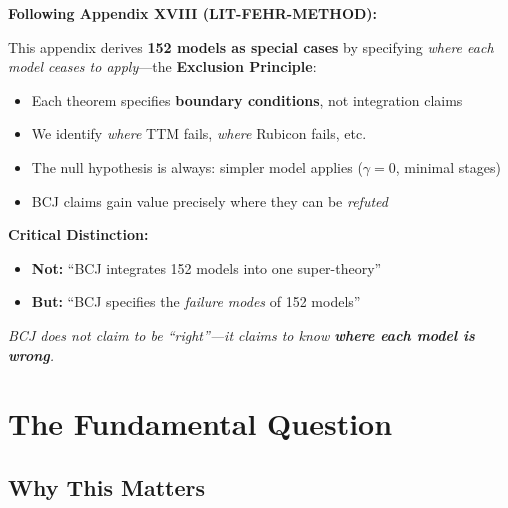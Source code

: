 \begin{tcolorbox}[colback=red!5!white, colframe=red!75!black,
    title=\textbf{Methodological Note: Boundary Specification, Not Integration}]

\textbf{Following Appendix XVIII (LIT-FEHR-METHOD):}

This appendix derives \textbf{152 models as special cases} by specifying \textit{where each model ceases to apply}---the \textbf{Exclusion Principle}:

\begin{itemize}[nosep]
    \item Each theorem specifies \textbf{boundary conditions}, not integration claims
    \item We identify \textit{where} TTM fails, \textit{where} Rubicon fails, etc.
    \item The null hypothesis is always: simpler model applies ($\gamma = 0$, minimal stages)
    \item BCJ claims gain value precisely where they can be \textit{refuted}
\end{itemize}

\medskip
\textbf{Critical Distinction:}
\begin{itemize}[nosep]
    \item \textbf{Not:} ``BCJ integrates 152 models into one super-theory''
    \item \textbf{But:} ``BCJ specifies the \textit{failure modes} of 152 models''
\end{itemize}

\textit{BCJ does not claim to be ``right''---it claims to know \textbf{where each model is wrong}.}
\end{tcolorbox}



\section{The Fundamental Question}
\label{sec:bcj-fundamental}

\subsection{Why This Matters}

